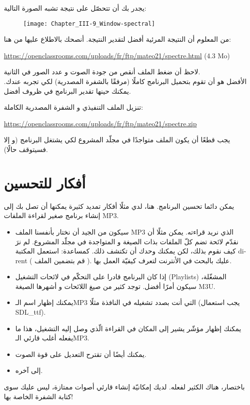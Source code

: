 يجدر بك أن تتحصّل على نتيجة تشبه الصورة التالية:

\begin{figure}[H]
	\centering
	\texttt{[image: Chapter\_III-9\_Window-spectral]}
\end{figure}

من المعلوم أن النتيجة المرئية أفضل لتقدير النتيجة. أنصحك بالاطلاع عليها من هنا:

\textenglish{\url{https://openclassrooms.com/uploads/fr/ftp/mateo21/spectre.html} (4.3 Mo)}

لاحظ أن ضغط الملف أنقص من جودة الصوت و عدد الصور في الثانية.\\
الأفضل هو أن تقوم بتحميل البرنامج كاملًا (مرفقًا بالشفرة المصدرية) لكي تجربه عندك. يمكنك حينها تقدير البرنامج في ظروف أفضل.

تنزيل الملف التنفيذي و الشفرة المصدرية الكاملة:

\url{https://openclassrooms.com/uploads/fr/ftp/mateo21/spectre.zip}

\begin{critical}
يجب قطعًا أن يكون الملف
متواجدًا في مجلّد المشروع لكي يشتغل البرنامج (و إلا فسيتوقف حالًا).
\end{critical}

\section*{أفكار للتحسين}

يمكن دائما تحسين البرنامج. هنا، لدي مثلًا أفكار تمديد كثيرة يمكنها أن تصل بك إلى إنشاء برنامج صغير لقراءة الملفات
\textenglish{MP3}.

\begin{itemize}
	\item سيكون من الجيد أن نختار بأنفسنا الملف
	\textenglish{MP3}
	الذي نريد قراءته. يمكن مثلًا أن نقدّم لائحة تضم كلّ الملفات بذات الصيغة و المتواجدة في مجلّد المشروع. لم نرَ كيف نقوم بذلك، لكن يمكنك وحدك أن تكتشف ذلك. كمساعدة: استعمل المكتبة
	\textenglish{dirent}
	( قم بتضمين الملف 
	).
	عليك بالبحث في الأنترنت لتعرف كيفيّة العمل بها.
	\item إذا كان البرنامج قادرا على التحكّم في لائحات التشغيل
	(\textenglish{Playlists})
	المشغّلة، سيكون أمرًا أفضل. توجد كثير من صيغ اللائحات و أشهرها الصيغة
	\textenglish{M3U}.
	\item يمكنك إظهار اسم الـ\textenglish{MP3}
	التي أنت بصدد تشغيله في النافذة مثلًا (يجب استعمال
	\textenglish{SDL\_ttf}).
	\item يمكنك إظهار مؤشّر يشير إلى المكان في القراءة الّذي وصل إليه التشغيل، هذا ما يفعله أغلب قارئي الـ\textenglish{MP3}.
	\item يمكنك أيضًا أن تقترح التعديل على قوة الصوت.
	\item إلى آخره.
\end{itemize}

باختصار، هناك الكثير لفعله. لديك إمكانيّة إنشاء قارئي أصوات ممتازة، ليس عليك سوى كتابة الشفرة الخاصة بها!

